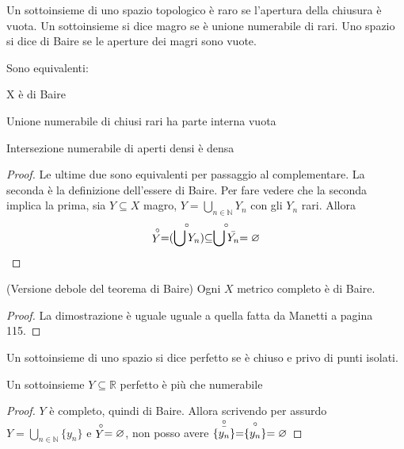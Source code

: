 \begin{defn}
    Un sottoinsieme di uno spazio topologico \`e raro se l'apertura della chiusura \`e vuota. Un sottoinsieme si dice magro se \`e unione numerabile di rari. Uno spazio si dice di Baire se le aperture dei magri sono vuote.
\end{defn}
\begin{prop}
    Sono equivalenti:
    \begin{nlist}
        \item X \`e di Baire
        \item Unione numerabile di chiusi rari ha parte interna vuota
        \item Intersezione numerabile di aperti densi \`e densa
    \end{nlist}
\end{prop}
\begin{proof}
    Le ultime due sono equivalenti per passaggio al complementare. La seconda \`e la definizione dell'essere di Baire. Per fare vedere che la seconda implica la prima, sia $Y\subseteq X$ magro, $Y=\bigcup_{n\in\mathbb{N}}Y_n$ con gli $Y_n$ rari. Allora
    \[
    \stackrel{\circ}{Y}=\stackrel{\circ}{(\bigcup Y_n)}\subseteq\stackrel{\circ}{\bigcup \bar{Y_n}}=\varnothing
    \]
\end{proof}
\begin{thm}(Versione debole del teorema di Baire)
    Ogni $X$ metrico completo \`e di Baire.
\end{thm}
\begin{proof}
    La dimostrazione \`e uguale uguale a quella fatta da Manetti a pagina 115.
\end{proof}

\begin{defn}
    Un sottoinsieme di uno spazio si dice perfetto se \`e chiuso e privo di punti isolati.
\end{defn}
\begin{prop} Un sottoinsieme $Y\subseteq\mathbb{R}$ perfetto \`e pi\`u che numerabile
\end{prop}
\begin{proof}
    $Y$ \`e completo, quindi di Baire. Allora scrivendo per assurdo $Y=\bigcup_{n\in\mathbb{N}}\{y_n\}$ e $\stackrel{\circ}{Y}=\varnothing$, non posso avere $\stackrel{\circ}{\bar{\{y_n\}}}=\stackrel{\circ}{\{y_n\}}=\varnothing$
\end{proof}
